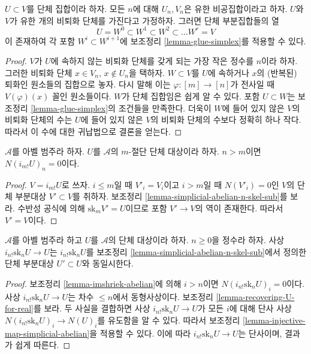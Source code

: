 \begin{lemma}
\label{lemma-add-simplices}
$U \subset V$를 단체 집합이라 하자. 모든 $n$에 대해 $U_n, V_n$은
유한 비공집합이라고 하자. $U$와 $V$가 유한 개의 비퇴화 단체를 가진다고
가정하자. 그러면 단체 부분집합들의 열
$$
U = W^0 \subset W^1 \subset W^2 \subset \ldots W^r = V
$$
이 존재하여 각 포함 $W^i \subset W^{i + 1}$에 보조정리
\ref{lemma-glue-simplex}를 적용할 수 있다.
\end{lemma}

\begin{proof}
$V$가 $U$에 속하지 않는 비퇴화 단체를 갖게 되는 가장 작은 정수를
$n$이라 하자. 그러한 비퇴화 단체 $x \in V_n$, $x\not \in U_n$을 택하자.
$W \subset V$를 $U$에 속하거나 $x$의 (반복된) 퇴화인 원소들의 집합으로
놓자. 다시 말해 이는 $\varphi : [m] \to [n]$가 전사일 때
$V(\varphi)(x)$ 꼴인 원소들이다. $W$가 단체 집합임은 쉽게 알 수 있다.
포함 $U \subset W$는 보조정리 \ref{lemma-glue-simplex}의 조건들을
만족한다. 더욱이 $W$에 들어 있지 않은 $V$의 비퇴화 단체의 수는
$U$에 들어 있지 않은 $V$의 비퇴화 단체의 수보다 정확히 하나 작다.
따라서 이 수에 대한 귀납법으로 결론을 얻는다.
\end{proof}

\begin{lemma}
\label{lemma-imshriek-abelian}
$\mathcal{A}$를 아벨 범주라 하자. $U$를 $\mathcal{A}$의 $m$-절단 단체
대상이라 하자. $n > m$이면 $N(i_{m!}U)_n = 0$이다.
\end{lemma}

\begin{proof}
$V = i_{m!}U$로 쓰자. $i \leq m$일 때 $V'_i = V_i$이고 $i > m$일 때
$N(V'_i) = 0$인 $V$의 단체 부분대상 $V' \subset V$를 취하자.
보조정리 \ref{lemma-simplicial-abelian-n-skel-sub}를 보라.
수반성 공식에 의해 $\text{sk}_m V' = U$이므로 포함 $V' \to V$의 역이
존재한다. 따라서 $V' = V$이다.
\end{proof}

\begin{lemma}
\label{lemma-n-skeleton-abelian}
$\mathcal{A}$를 아벨 범주라 하고 $U$를 $\mathcal{A}$의 단체 대상이라
하자. $n \geq 0$을 정수라 하자. 사상 $i_{n!} \text{sk}_n U \to U$는
$i_{n!} \text{sk}_n U$를 보조정리
\ref{lemma-simplicial-abelian-n-skel-sub}에서 정의한 단체 부분대상
$U' \subset U$와 동일시한다.
\end{lemma}

\begin{proof}
보조정리 \ref{lemma-imshriek-abelian}에 의해 $i > n$이면
$N(i_{n!} \text{sk}_n U)_i = 0$이다. 사상
$i_{n!} \text{sk}_n U \to U$는 차수 $\leq n$에서 동형사상이다.
보조정리 \ref{lemma-recovering-U-for-real}를 보라. 두 사실을 결합하면
사상 $i_{n!} \text{sk}_n U \to U$가 모든 $i$에 대해 단사 사상
$N(i_{n!} \text{sk}_n U)_i \to N(U)_i$를 유도함을 알 수 있다.
따라서 보조정리 \ref{lemma-injective-map-simplicial-abelian}을 적용할 수 있다.
이에 따라 $i_{n!} \text{sk}_n U \to U$는 단사이며, 결과가 쉽게 따른다.
\end{proof}

